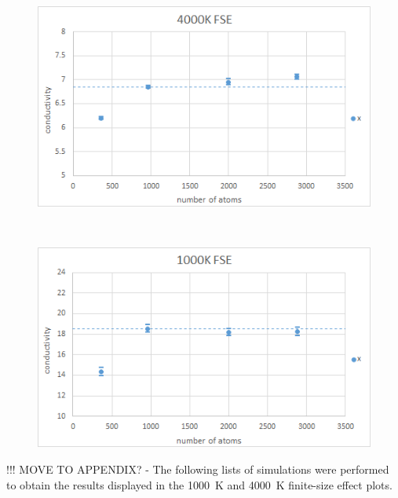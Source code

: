 \begin{figure}[h!]
\includegraphics[width=\linewidth]{Figures/gk_fse_4K_draft.png}
\caption[gk fse 4k]{}
\label{fig:gk_fse_4K}
\end{figure}
~
\begin{figure}[h!]
\includegraphics[width=\linewidth]{Figures/gk_fse_1K_draft.png}
\caption[gk fse 1k]{}
\label{fig:gk_fse_1K}
\end{figure}


%
\pagebreak
%


!!! MOVE TO APPENDIX? - The following lists of simulations were performed to obtain the results displayed in the 1000~K and 4000~K finite-size effect plots.

